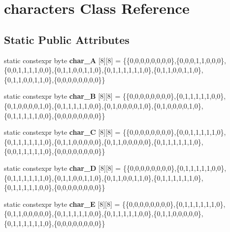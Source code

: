 \hypertarget{classcharacters}{}\section{characters Class Reference}
\label{classcharacters}
\subsection*{Static Public Attributes}
\begin{DoxyCompactItemize}
\item 
static constexpr byte {\bfseries char\+\_\+A} \mbox{[}8\mbox{]}\mbox{[}8\mbox{]} = \{\{0,0,0,0,0,0,0,0\},\{0,0,0,1,1,0,0,0\},\{0,0,1,1,1,1,0,0\},\{0,1,1,0,0,1,1,0\},\{0,1,1,1,1,1,1,0\},\{0,1,1,0,0,1,1,0\},\{0,1,1,0,0,1,1,0\},\{0,0,0,0,0,0,0,0\}\}\hypertarget{classcharacters_adae5b4143716cc439dac1756cd60560d}{}\label{classcharacters_adae5b4143716cc439dac1756cd60560d}

\item 
static constexpr byte {\bfseries char\+\_\+B} \mbox{[}8\mbox{]}\mbox{[}8\mbox{]} = \{\{0,0,0,0,0,0,0,0\},\{0,1,1,1,1,1,0,0\},\{0,1,0,0,0,0,1,0\},\{0,1,1,1,1,1,0,0\},\{0,1,0,0,0,0,1,0\},\{0,1,0,0,0,0,1,0\},\{0,1,1,1,1,1,0,0\},\{0,0,0,0,0,0,0,0\}\}\hypertarget{classcharacters_a0eadc6726a0c0434e5ddd3757e7dfbed}{}\label{classcharacters_a0eadc6726a0c0434e5ddd3757e7dfbed}

\item 
static constexpr byte {\bfseries char\+\_\+C} \mbox{[}8\mbox{]}\mbox{[}8\mbox{]} = \{\{0,0,0,0,0,0,0,0\},\{0,0,1,1,1,1,1,0\},\{0,1,1,1,1,1,1,0\},\{0,1,1,0,0,0,0,0\},\{0,1,1,0,0,0,0,0\},\{0,1,1,1,1,1,1,0\},\{0,0,1,1,1,1,1,0\},\{0,0,0,0,0,0,0,0\}\}\hypertarget{classcharacters_a1db370a0e9ccae7fc5b57ec63342b95d}{}\label{classcharacters_a1db370a0e9ccae7fc5b57ec63342b95d}

\item 
static constexpr byte {\bfseries char\+\_\+D} \mbox{[}8\mbox{]}\mbox{[}8\mbox{]} = \{\{0,0,0,0,0,0,0,0\},\{0,1,1,1,1,1,0,0\},\{0,1,1,1,1,1,1,0\},\{0,1,1,0,0,1,1,0\},\{0,1,1,0,0,1,1,0\},\{0,1,1,1,1,1,1,0\},\{0,1,1,1,1,1,0,0\},\{0,0,0,0,0,0,0,0\}\}\hypertarget{classcharacters_a4759d3044fdbb16d48ee7fde09f09fbc}{}\label{classcharacters_a4759d3044fdbb16d48ee7fde09f09fbc}

\item 
static constexpr byte {\bfseries char\+\_\+E} \mbox{[}8\mbox{]}\mbox{[}8\mbox{]} = \{\{0,0,0,0,0,0,0,0\},\{0,1,1,1,1,1,1,0\},\{0,1,1,0,0,0,0,0\},\{0,1,1,1,1,1,0,0\},\{0,1,1,1,1,1,0,0\},\{0,1,1,0,0,0,0,0\},\{0,1,1,1,1,1,1,0\},\{0,0,0,0,0,0,0,0\}\}\hypertarget{classcharacters_afb86439d76612275852389f08d68bcb3}{}\label{classcharacters_afb86439d76612275852389f08d68bcb3}


\end{DoxyCompactItemize}
